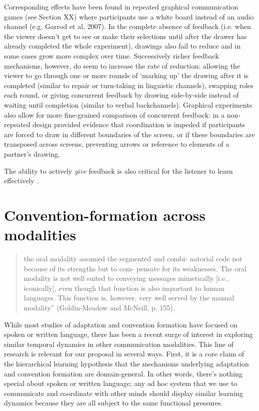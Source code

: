 \documentclass[11pt, floatsintext, man]{apa6}
\begin{document}
Corresponding effects have been found in repeated graphical communication games (see Section XX) where participants use a white board instead of an audio channel (e.g. Garrod et al, 2007). In the complete absence of feedback (i.e. when the viewer doesn't get to see or make their selections until after the drawer has already completed the whole experiment), drawings also fail to reduce and in some cases grow more complex over time. Successively richer feedback mechanisms, however, do seem to increase the rate of reduction: allowing the viewer to go through one or more rounds of `marking up' the drawing after it is completed (similar to repair or turn-taking in linguistic channels), swapping roles each round, or giving concurrent feedback by drawing side-by-side instead of waiting until completion (similar to verbal backchannels). Graphical experiments also allow for more fine-grained comparison of concurrent feedback: in a non-repeated design provided evidence that coordination is impeded if participants are forced to draw in different boundaries of the screen, or if these boundaries are transposed across screens, preventing arrows or reference to elements of a partner's drawing. 

The ability to actively \emph{give} feedback is also critical for the listener to learn effectively \cite{SchoberClark89_Overhearers}. 


\section{Convention-formation across modalities}

\begin{quote}
the oral modality assumed the segmented and combi- natorial code not because of its strengths but to com- pensate for its weaknesses. The oral modality is not well suited to conveying messages mimetically [i.e., iconically], even though that function is also important to human languages. This function is, however, very well served by the manual modality'' (Goldin-Meadow and McNeill, p. 155).
\end{quote}

While most studies of adaptation and convention formation have focused on spoken or written language, there has been a recent surge of interest in exploring similar temporal dynamics in other communication modalities. This line of research is relevant for our proposal in several ways. First, it is a core claim of the hierarchical learning hypothesis that the mechanisms underlying adaptation and convention formation are domain-general. In other words, there's nothing special about spoken or written language; any ad hoc system that we use to communicate and coordinate with other minds should display similar learning dynamics because they are all subject to the same functional pressures. 
\end{document}
